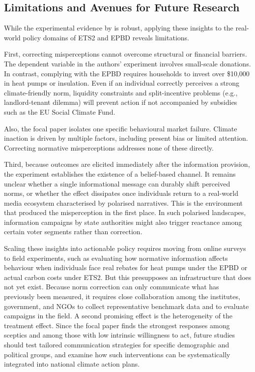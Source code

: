\documentclass[11pt,a4paper]{scrartcl}
\numberwithin{equation}{section}
\theoremstyle{definition}
\theoremstyle{remark}
\begin{document}
\subsection{Limitations and Avenues for Future Research}
\label{subsec:Limitations and Future Research}

    While the experimental evidence by \textcite{andre2024} is robust, applying these insights to the real-world policy domains of ETS2 and EPBD reveals limitations.

    First, correcting misperceptions cannot overcome structural or financial barriers. The dependent variable in the authors' experiment involves small-scale donations. In contrast, complying with the EPBD requires households to invest over  \$10,000 in heat pumps or insulation. Even if an individual correctly perceives a strong climate-friendly norm, liquidity constraints and split-incentive problems (e.g., landlord-tenant dilemma) will prevent action if not accompanied by subsidies such as the EU Social Climate Fund.

    Also, the focal paper isolates one specific behavioural market failure. Climate inaction is driven by multiple factors, including present bias or limited attention. Correcting normative misperceptions addresses none of these directly. 

    Third, because outcomes are elicited immediately after the information provision, the experiment establishes the existence of a belief-based channel. It remains unclear whether a single informational message can durably shift perceived norms, or whether the effect dissipates once individuals return to a real-world media ecosystem characterised by polarised narratives. This is the environment that produced the misperception in the first place. In such polarised landscapes, information campaigns by state authorities might also trigger reactance among certain voter segments rather than correction.

    Scaling these insights into actionable policy requires moving from online surveys to field experiments, such as evaluating how normative information affects behaviour when individuals face real rebates for heat pumps under the EPBD or actual carbon costs under ETS2. But this presupposes an infrastructure that does not yet exist. Because norm correction can only communicate what has previously been measured, it requires close collaboration among the institutes, government, and NGOs to collect representative benchmark data and to evaluate campaigns in the field. A second promising effect is the heterogeneity of the treatment effect. Since the focal paper finds the strongest responses among sceptics and among those with low intrinsic willingness to act, future studies should test tailored communication strategies for specific demographic and political groups, and examine how such interventions can be systematically integrated into national climate action plans.
\end{document}
